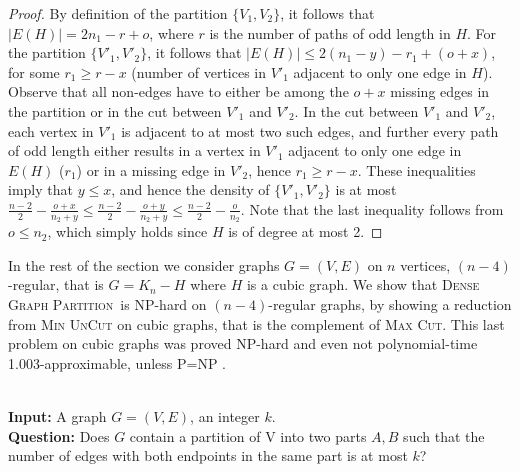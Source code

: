 \documentclass[a4paper,USenglish,cleveref, autoref]{lipics-v2021}
\newcommand\DGP{\textsc{Dense Graph Partition}}
\newcommand\MDGP{\textsc{Max Dense Graph Partition}}
\newcommand\UC{\textsc{Min UnCut}}
\newcommand{\defprob}[3]{
\begin{center}
{\begin{minipage}{.95\textwidth}
\noindent{\sc #1}\\\nopagebreak
{\bf Input:} #2 \\\nopagebreak
{\bf Question:} #3
\end{minipage}}
\end{center}
}
\begin{document}
\begin{proof}
 By definition of the partition $\{V_1,V_2\}$, it follows that $|E(H)|=2n_1-r+o$, where $r$ is the number of paths of odd length in $H$. For the partition $\{V'_1,V'_2\}$, it follows that $|E(H)|\leq 2(n_1-y)-r_1+(o+x)$, for some $r_1\geq r-x$ (number of vertices in $V'_1$ adjacent to only one edge in $H$). Observe that all non-edges have to either be among the $o+x$ missing edges in the partition or in the cut between $V'_1$ and $V'_2$. In the cut between $V'_1$ and $V'_2$, each vertex in $V'_1$ is adjacent to at most two such edges, and further every path of odd length either results in a vertex in $V'_1$ adjacent to only one edge  in $E(H)$ ($r_1$) or in a missing edge in $V'_2$, hence $r_1\geq r-x$. These inequalities imply that $y\leq x$, and hence the density of $\{V'_1,V'_2\}$ is at most $\frac{n-2}{2}- \frac{o+x}{n_2+y} \leq \frac{n-2}{2}- \frac{o+y}{n_2+y}\leq  \frac{n-2}{2}- \frac{o}{n_2}$.  Note that the last inequality follows from $o\leq {n_2}$, which simply holds since $H$ is of degree at most 2.
 \end{proof}


In the rest of the section  we consider graphs $G=(V,E)$ on $n$ vertices, $(n-4)$-regular, that is  $G=K_n-H$ where $H$ is a cubic graph. 
We show that \DGP~is NP-hard on $(n-4)$-regular graphs, by showing  a reduction from \UC{} on cubic graphs,  that is the complement of \textsc{Max Cut}.  This last problem on cubic graphs was proved  NP-hard and even not polynomial-time  1.003-approximable, unless P=NP \cite{BK99}.
 

\defprob{Min UnCut}{A graph $G=(V,E)$, an integer $k$.}{Does $G$ contain a partition of V into two parts $A, B$ such that the number of edges with both endpoints in the same part is at most $k$?}  
\end{document}
